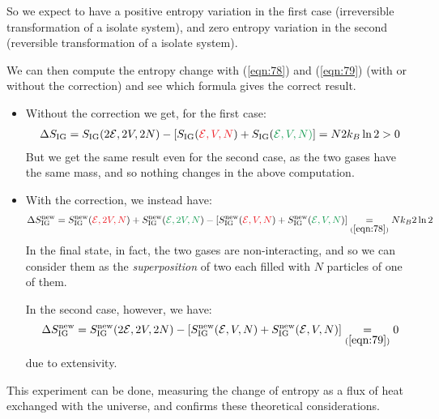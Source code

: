 \documentclass[../../main.tex]{subfiles}
\begin{document}
\medskip

So we expect to have a positive entropy variation in the first case (irreversible transformation of a isolate system), and zero entropy variation in the second (reversible transformation of a isolate system). 
 
\medskip

We can then compute the entropy change with (\ref{eqn:78}) and (\ref{eqn:79}) (with or without the correction) and see which formula gives the correct result. 

\begin{itemize}
    \item Without the correction we get, for the first case:
    \begin{align*}
        \Delta S_{\mathrm{IG}} = S_{\mathrm{IG}}(2 \mathcal{E}, 2V, 2N) - [S_{\mathrm{IG}}(\textcolor{Red}{\mathcal{E}, V, N}) + S_{\mathrm{IG}}(\textcolor{ForestGreen}{\mathcal{E}, V, N)}] = N 2 k_B \ln 2 > 0
    \end{align*}
    But we get the same result even for the second case, as the two gases have the same mass, and so nothing changes in the above computation.
    \item With the correction, we instead have:
    \begin{align*}
        \Delta S_{\mathrm{IG}}^{\mathrm{new}} = S_{\mathrm{IG}}^{\mathrm{new}}(\textcolor{Red}{\mathcal{E}, 2V, N}) + S_{\mathrm{IG}}^{\mathrm{new}}(\textcolor{ForestGreen}{\mathcal{E}, 2V, N}) - [S_{\mathrm{IG}}^{\mathrm{new}}(\textcolor{Red}{\mathcal{E}, V, N}) + S_{\mathrm{IG}}^{\rm{new}}(\textcolor{ForestGreen}{\mathcal{E}, V, N})] \underset{(\ref{eqn:78})}{=}  Nk_B 2 \ln 2
    \end{align*}
    In the final state, in fact, the two gases are non-interacting, and so we can consider them as the \textit{superposition} of two  each filled with $N$ particles of one of them.
    
    \medskip

    In the second case, however, we have:
    \begin{align*}
        \Delta S_{\mathrm{IG}}^{\mathrm{new}} = S_{\mathrm{IG}}^{\mathrm{new}} (2 \mathcal{E}, 2V, 2N) - [S_{\mathrm{IG}}^{\mathrm{new}}(\mathcal{E}, V, N) + S_{\mathrm{IG}}^{\mathrm{new}}(\mathcal{E}, V, N)] \underset{(\ref{eqn:79})}{=}  0
    \end{align*}
    due to extensivity.
\end{itemize}

This experiment can be done, measuring the change of entropy as a flux of heat exchanged with the universe, and confirms these theoretical considerations.
\end{document}
